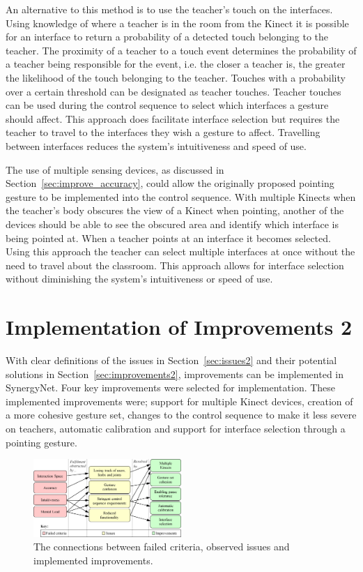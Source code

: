 \documentclass[manuscript, review, screen]{acmart}
\begin{document}
An alternative to this method is to use the teacher's touch on the interfaces.
Using knowledge of where a teacher is in the room from the Kinect it is possible for an interface to return a probability of a detected touch belonging to the teacher.
The proximity of a teacher to a touch event determines the probability of a teacher being responsible for the event, i.e. the closer a teacher is, the greater the likelihood of the touch belonging to the teacher.
Touches with a probability over a certain threshold can be designated as teacher touches.
Teacher touches can be used during the control sequence to select which interfaces a gesture should affect.
This approach does facilitate interface selection but requires the teacher to travel to the interfaces they wish a gesture to affect.
Travelling between interfaces reduces the system's intuitiveness and speed of use.

The use of multiple sensing devices, as discussed in Section~\ref{sec:improve_accuracy}, could allow the originally proposed pointing gesture to be implemented into the control sequence.
With multiple Kinects when the teacher's body obscures the view of a Kinect when pointing, another of the devices should be able to see the obscured area and identify which interface is being pointed at.
When a teacher points at an interface it becomes selected.
Using this approach the teacher can select multiple interfaces at once without the need to travel about the classroom.
This approach allows for interface selection without diminishing the system's intuitiveness or speed of use.

\section{Implementation of Improvements 2}  
\label{sec:implementation2}

With clear definitions of the issues in Section~\ref{sec:issues2} and their potential solutions in Section~\ref{sec:improvements2}, improvements can be implemented in SynergyNet.
Four key improvements were selected for implementation.
These implemented improvements were; support for multiple Kinect devices, creation of a more cohesive gesture set, changes to the control sequence to make it less severe on teachers, automatic calibration and support for interface selection through a pointing gesture.

\begin{figure}[h]
  \centering
  \includegraphics[width=0.5\textwidth]{figures/issue_flow_diagram.png}
  \caption{The connections between failed criteria, observed issues and implemented improvements.}
  \label{fig:issueFlow}
\end{figure}
\end{document}
